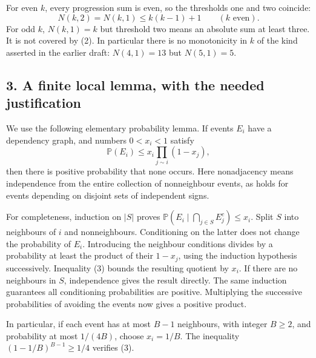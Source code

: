 For even $k$, every progression sum is even, so the thresholds one and two coincide:
\[
 N(k,2)=N(k,1)\le k(k-1)+1\qquad(k\text{ even}).\tag{2}
\]
For odd $k$, $N(k,1)=k$ but threshold two means an absolute sum at least three. It is not covered by (2). In particular there is no monotonicity in $k$ of the kind asserted in the earlier draft: $N(4,1)=13$ but $N(5,1)=5$.

\subsection*{3. A finite local lemma, with the needed justification}
We use the following elementary probability lemma. If events $E_i$ have a dependency graph, and numbers $0<x_i<1$ satisfy
\[
 \mathbb P(E_i)\le x_i\prod_{j\sim i}(1-x_j),\tag{3}
\]
then there is positive probability that none occurs. Here nonadjacency means independence from the entire collection of nonneighbour events, as holds for events depending on disjoint sets of independent signs.

For completeness, induction on $|S|$ proves
$\mathbb P(E_i\mid\bigcap_{j\in S}E_j^c)\le x_i$.
Split $S$ into neighbours of $i$ and nonneighbours. Conditioning on the latter does not change the probability of $E_i$. Introducing the neighbour conditions divides by a probability at least the product of their $1-x_j$, using the induction hypothesis successively. Inequality (3) bounds the resulting quotient by $x_i$. If there are no neighbours in $S$, independence gives the result directly. The same induction guarantees all conditioning probabilities are positive. Multiplying the successive probabilities of avoiding the events now gives a positive product.

In particular, if each event has at most $B-1$ neighbours, with integer $B\ge2$, and probability at most $1/(4B)$, choose $x_i=1/B$. The inequality
$(1-1/B)^{B-1}\ge1/4$ verifies (3).

